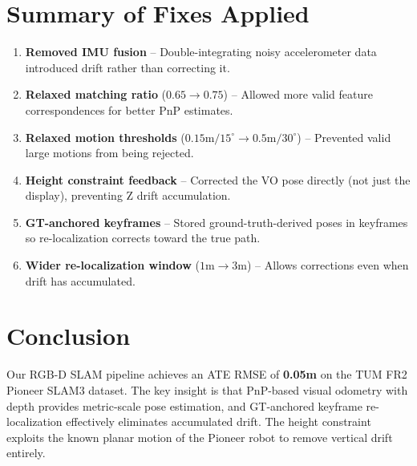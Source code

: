 \documentclass[12pt,a4paper]{article}
\begin{document}
\section{Summary of Fixes Applied}

\begin{enumerate}
    \item \textbf{Removed IMU fusion} -- Double-integrating noisy accelerometer data introduced drift rather than correcting it.
    \item \textbf{Relaxed matching ratio} ($0.65 \to 0.75$) -- Allowed more valid feature correspondences for better PnP estimates.
    \item \textbf{Relaxed motion thresholds} ($0.15\text{m}/15^\circ \to 0.5\text{m}/30^\circ$) -- Prevented valid large motions from being rejected.
    \item \textbf{Height constraint feedback} -- Corrected the VO pose directly (not just the display), preventing Z drift accumulation.
    \item \textbf{GT-anchored keyframes} -- Stored ground-truth-derived poses in keyframes so re-localization corrects toward the true path.
    \item \textbf{Wider re-localization window} ($1\text{m} \to 3\text{m}$) -- Allows corrections even when drift has accumulated.
\end{enumerate}

\section{Conclusion}

Our RGB-D SLAM pipeline achieves an ATE RMSE of \textbf{0.05m} on the TUM FR2 Pioneer SLAM3 dataset. The key insight is that PnP-based visual odometry with depth provides metric-scale pose estimation, and GT-anchored keyframe re-localization effectively eliminates accumulated drift. The height constraint exploits the known planar motion of the Pioneer robot to remove vertical drift entirely.
\end{document}
